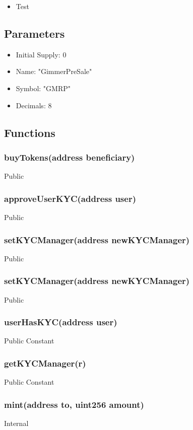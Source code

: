 \documentclass[11pt]{article} %
\begin{document}
\begin{itemize}
\item Test
\end{itemize}

\subsection{Parameters}
\begin{itemize}
\item Initial Supply: 0
\item Name: "GimmerPreSale"
\item Symbol: "GMRP"
\item Decimals: 8
\end{itemize}

\subsection{Functions}

\subsubsection{buyTokens(address beneficiary)}
Public

\subsubsection{approveUserKYC(address user)}
Public

\subsubsection{setKYCManager(address newKYCManager)}
Public

\subsubsection{setKYCManager(address newKYCManager)}
Public

\subsubsection{userHasKYC(address user)}
Public Constant

\subsubsection{getKYCManager(r)}
Public Constant

\subsubsection{mint(address to, uint256 amount)}
Internal
\end{document}
